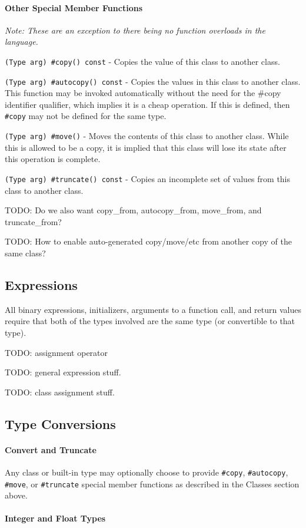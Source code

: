 \documentclass{article}
\newcommand{\code}[1]{\colorbox{light-gray}{\texttt{#1}}}
\newcommand{\breakingparagraph}[1]{\paragraph{#1}\mbox{}\medbreak}
\begin{document}
\breakingparagraph{Other Special Member Functions}

\textit{Note: These are an exception to there being no function overloads in the language.}

\code{(Type arg) \#copy() const} - Copies the value of this class to another class.

\code{(Type arg) \#autocopy() const} - Copies the values in this class to another class.  This function may be invoked automatically without the need for the \#copy identifier qualifier, which implies it is a cheap operation.  If this is defined, then \code{\#copy} may not be defined for the same type.

\code{(Type arg) \#move()} - Moves the contents of this class to another class.  While this is allowed to be a copy, it is implied that this class will lose its state after this operation is complete.

\code{(Type arg) \#truncate() const} - Copies an incomplete set of values from this class to another class.

TODO: Do we also want copy_from, autocopy_from, move_from, and truncate_from?

TODO: How to enable auto-generated copy/move/etc from another copy of the same class?

\subsection{Expressions}

All binary expressions, initializers, arguments to a function call, and return values require that both of the types involved are the same type (or convertible to that type).

TODO: assignment operator

TODO: general expression stuff.

TODO: class assignment stuff.

\subsection{Type Conversions}

\breakingparagraph{Convert and Truncate}

Any class or built-in type may optionally choose to provide \code{\#copy}, \code{\#autocopy}, \code{\#move}, or \code{\#truncate} special member functions as described in the Classes section above.

\breakingparagraph{Integer and Float Types}
\end{document}
